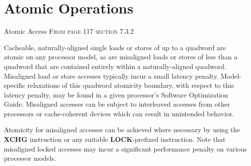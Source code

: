 \documentclass[10pt,aspectratio=169]{beamer}
\begin{document}
%
%
%
%
%




\section{Atomic Operations}

\begin{frame}{Atomic Access}
    \textsc{From page 117 section 7.3.2 \cite{AMD64ArchVol2}}

    \alert{Cacheable, naturally-aligned single loads or stores} of up to a
quadword \alert{are atomic on any processor model}, as are misaligned loads or stores of less than a quadword that are contained entirely within a naturally-aligned quadword.
Misaligned load or store accesses typically incur a small latency penalty.
Model-specific relaxations of this quadword atomicity boundary, with respect to this latency penalty, may be found in a given processor's Software Optimization Guide.
Misaligned accesses can be subject to interleaved accesses from other processors or cache-coherent devices which can result in unintended behavior.

Atomicity \alert{for misaligned} accesses can be achieved
where necessary by using the \textbf{XCHG} instruction or any suitable \textbf{LOCK}-prefixed instruction.
Note that misaligned locked accesses may incur a significant performance penalty on various processor models.
\end{frame}
\end{document}
